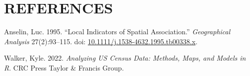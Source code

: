 \documentclass[
]{DissertateCUNY}
\newlength{\cslhangindent}
\newlength{\cslentryspacingunit} %
\newenvironment{CSLReferences}[2] %
 {%
  \setlength{\parindent}{0pt}
  \ifodd #1
  \let\oldpar\par
  \def\par{\hangindent=\cslhangindent\oldpar}
  \fi
  \setlength{\parskip}{#2\cslentryspacingunit}
 }%
 {}
\begin{document}
\fancyhead[R]{\thepage}
\fancyfoot[C]{}

\chapter*{REFERENCES}
\singlespacing

\setlength{\parskip}{6pt}

\noindent

\hypertarget{refs}{}
\begin{CSLReferences}{1}{0}
\leavevmode{}%
Anselin, Luc. 1995. {``Local {Indicators} of {Spatial
Association}.''} \emph{Geographical Analysis}
27(2):93--115. doi:
\href{https://doi.org/10.1111/j.1538-4632.1995.tb00338.x}{10.1111/j.1538-4632.1995.tb00338.x}.

\leavevmode{}%
Walker, Kyle. 2022. \emph{Analyzing {US Census Data}: {Methods}, {Maps},
and {Models} in {R}}. {CRC Press Taylor \& Francis Group}.

\end{CSLReferences}

\clearpage
\end{document}
